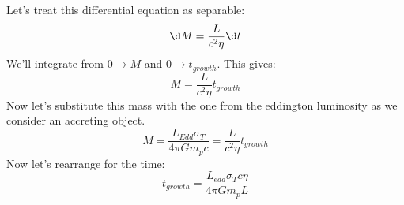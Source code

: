 Let's treat this differential equation as separable:
\begin{equation}
    \d M = \frac{L}{c^2\eta} \d t
\end{equation}
We'll integrate from $0\rightarrow M$ and $0\rightarrow t_{growth}$. This gives:
\begin{equation}
    M = \frac{L}{c^2\eta}t_{growth}
\end{equation}
Now let's substitute this mass with the one from the eddington luminosity as we consider an accreting object.
\begin{equation}
    M = \frac{L_{Edd}\sigma_T}{4\pi G m_p c} = \frac{L}{c^2\eta}t_{growth}
\end{equation}
Now let's rearrange for the time:
\begin{equation}
    t_{growth} = \frac{L_{edd}\sigma_T c\eta}{4\pi Gm_p L}
\end{equation}